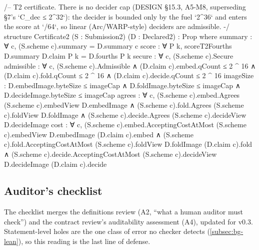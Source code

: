 \begin{leancode}[fontsize=\scriptsize,label={\footnotesize Contract/Certificate.lean}]
/-- T2 certificate. There is no decider cap (DESIGN §15.3, A5-M8, superseding §7's
`C_dec ≤ 2^32`): the decider is bounded only by the fuel `2^36` and enters the score at `/64`, so
linear (Arc/WARP-style) deciders are admissible. -/
structure Certificate2 (S : Submission2) (D : Declared2) : Prop where
  summary : ∀ c, (S.scheme c).summary = D.summary c
  score : ∀ P k, scoreT2Fourths D.summary D.claim P k = D.fourths P k
  secure : ∀ c, (S.scheme c).Secure
  admissible : ∀ c, (S.scheme c).Admissible ∧ (D.claim c).embed.qCount ≤ 2 ^ 16 ∧
    (D.claim c).fold.qCount ≤ 2 ^ 16 ∧ (D.claim c).decide.qCount ≤ 2 ^ 16
  imageSize : D.embedImage.byteSize ≤ imageCap ∧ D.foldImage.byteSize ≤ imageCap ∧
    D.decideImage.byteSize ≤ imageCap
  agrees : ∀ c, (S.scheme c).embed.Agrees (S.scheme c).embedView D.embedImage ∧
    (S.scheme c).fold.Agrees (S.scheme c).foldView D.foldImage ∧
    (S.scheme c).decide.Agrees (S.scheme c).decideView D.decideImage
  cost : ∀ c, (S.scheme c).embed.AcceptingCostAtMost (S.scheme c).embedView D.embedImage (D.claim c).embed ∧
    (S.scheme c).fold.AcceptingCostAtMost (S.scheme c).foldView D.foldImage (D.claim c).fold ∧
    (S.scheme c).decide.AcceptingCostAtMost (S.scheme c).decideView D.decideImage (D.claim c).decide
\end{leancode}

\subsection{Auditor's checklist}\label{subsec:app-checklist}

The checklist merges the definitions review (A2, \enquote{what a human auditor must check}) and the
contract review's auditability assessment (A4), updated for v0.3. Statement-level holes are the one
class of error no checker detects (\cref{subsec:bg-lean}), so this reading is the last line of
defense.

